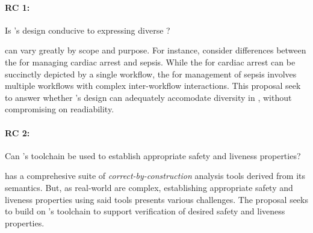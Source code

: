 \paragraph{RC 1:} Is \MediK{}'s design conducive to expressing diverse
\BPGs{}?

\BPGs{} can vary greatly by scope and purpose. For instance,
consider differences between the \BPGs{} for managing cardiac
arrest and sepsis. While the \BPG{} for cardiac arrest can be
succinctly depicted by a single workflow, the \BPG{} for
management of sepsis involves multiple workflows with complex
inter-workflow interactions. This proposal seek to answer whether \MediK{}'s
design can adequately accomodate diversity in \BPGs{}, without
compromising on readiability.

\paragraph{RC 2:} Can \MediK{}'s toolchain be used to establish
appropriate safety and liveness properties?

\MediK{} has a comprehesive suite of \emph{correct-by-construction}
analysis tools derived from its semantics. But, as real-world \BPGs{}
are complex, establishing appropriate safety and liveness properties using
said tools presents various challenges. The proposal seeks to build on
\MediK{}'s toolchain to support verification of desired safety and liveness
properties.




